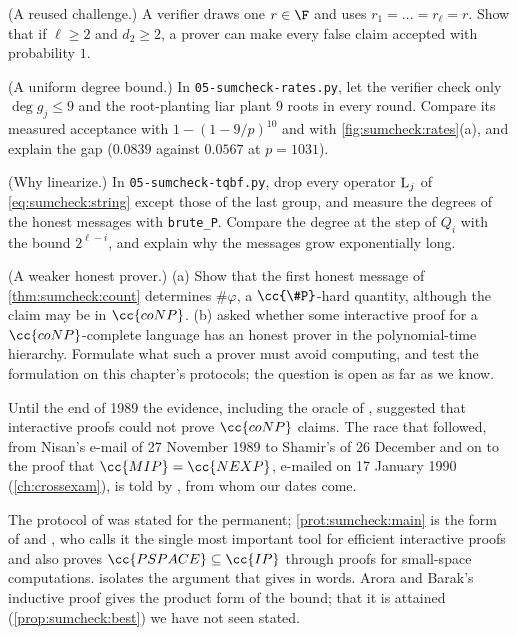 \begin{refsection}
\begin{exercises}
\item \attack (A reused challenge.) A verifier draws one $r\in\F$ and uses $r_1=\dots=r_\ell=r$. Show that if $\ell\ge2$ and $d_2\ge2$, a prover can make every false claim accepted with probability $1$. \label{ex:sumcheck:reuse}

\item \simulation (A uniform degree bound.) In \texttt{05-sumcheck-rates.py}, let the verifier check only $\deg g_j\le9$ and the root-planting liar plant $9$ roots in every round. Compare its measured acceptance with $1-(1-9/p)^{10}$ and with \cref{fig:sumcheck:rates}(a), and explain the gap ($0.0839$ against $0.0567$ at $p=1031$).\label{ex:sumcheck:uniform}

\item \simulation (Why linearize.) In \texttt{05-sumcheck-tqbf.py}, drop every operator $\mathrm{L}_j$ of \eqref{eq:sumcheck:string} except those of the last group, and measure the degrees of the honest messages with \texttt{brute\_P}. Compare the degree at the step of $Q_i$ with the bound $2^{\ell-i}$, and explain why the messages grow exponentially long.\label{ex:sumcheck:linearize}

\item \research (A weaker honest prover.) (a) Show that the first honest message of \cref{thm:sumcheck:count} determines $\#\varphi$, a $\cc{\#P}$-hard quantity, although the claim may be in $\cc{coNP}$. (b) \Textcite{Babai1990} asked whether some interactive proof for a $\cc{coNP}$-complete language has an honest prover in the polynomial-time hierarchy. Formulate what such a prover must avoid computing, and test the formulation on this chapter's protocols; the question is open as far as we know.\label{ex:sumcheck:weaker}
\end{exercises}

\notesandrefs
Until the end of 1989 the evidence, including the oracle of \textcite{FortnowSipser1988}, suggested that interactive proofs could not prove $\cc{coNP}$ claims. The race that followed, from Nisan's e-mail of 27 November 1989 to Shamir's of 26 December and on to the proof that $\cc{MIP}=\cc{NEXP}$, e-mailed on 17 January 1990 (\cref{ch:crossexam}), is told by \textcite{Babai1990}, from whom our dates come.

The protocol of \textcite{LundEtAl1992} was stated for the permanent; \cref{prot:sumcheck:main} is the form of \textcite[Chapter~8]{AroraBarak2009} and \textcite[Chapter~4]{Thaler2022}, who calls it the single most important tool for efficient interactive proofs and also proves $\cc{PSPACE}\subseteq\cc{IP}$ through proofs for small-space computations.  isolates the argument that \textcite{Babai1990} gives in words. Arora and Barak's inductive proof gives the product form of the bound; that it is attained (\cref{prop:sumcheck:best}) we have not seen stated.


\end{refsection}
